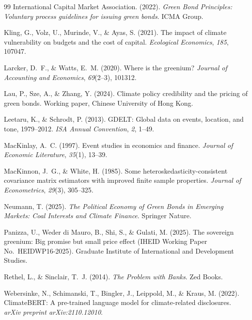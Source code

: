 \documentclass[12pt,a4paper]{article}
\begin{document}
\begin{thebibliography}{99}
International Capital Market Association. (2022).
\textit{Green Bond Principles: Voluntary process guidelines for issuing green bonds}.
ICMA Group.

Kling, G., Volz, U., Murinde, V., \& Ayas, S. (2021).
The impact of climate vulnerability on budgets and the cost of capital.
\textit{Ecological Economics}, \textit{185}, 107047.

Larcker, D.~F., \& Watts, E.~M. (2020).
Where is the greenium?
\textit{Journal of Accounting and Economics}, \textit{69}(2--3), 101312.

Lau, P., Sze, A., \& Zhang, Y. (2024).
Climate policy credibility and the pricing of green bonds.
Working paper, Chinese University of Hong Kong.

Leetaru, K., \& Schrodt, P. (2013).
GDELT: Global data on events, location, and tone, 1979--2012.
\textit{ISA Annual Convention}, \textit{2}, 1--49.

MacKinlay, A.~C. (1997).
Event studies in economics and finance.
\textit{Journal of Economic Literature}, \textit{35}(1), 13--39.

MacKinnon, J.~G., \& White, H. (1985).
Some heteroskedasticity-consistent covariance matrix estimators with improved finite sample properties.
\textit{Journal of Econometrics}, \textit{29}(3), 305--325.

Neumann, T. (2025).
\textit{The Political Economy of Green Bonds in Emerging Markets: Coal Interests and Climate Finance}.
Springer Nature.

Panizza, U., Weder di Mauro, B., Shi, S., \& Gulati, M. (2025).
The sovereign greenium: Big promise but small price effect
(IHEID Working Paper No.\ HEIDWP16-2025).
Graduate Institute of International and Development Studies.

Rethel, L., \& Sinclair, T.~J. (2014).
\textit{The Problem with Banks}.
Zed Books.

Webersinke, N., Schimanski, T., Bingler, J., Leippold, M., \& Kraus, M. (2022).
ClimateBERT: A pre-trained language model for climate-related disclosures.
\textit{arXiv preprint arXiv:2110.12010}.


\end{thebibliography}
\end{document}
